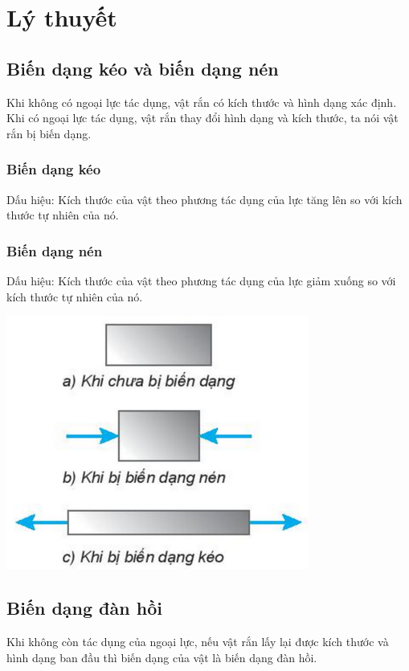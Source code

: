 \setcounter{section}{0}
\section{Lý thuyết}
\subsection{Biến dạng kéo và biến dạng nén}
Khi không có ngoại lực tác dụng, vật rắn có kích thước và hình dạng xác định. Khi có ngoại lực tác dụng, vật rắn thay đổi hình dạng và kích thước, ta nói vật rắn bị biến dạng.

\begin{minipage}{0.6\textwidth}
	\subsubsection{Biến dạng kéo}
	Dấu hiệu: Kích thước của vật theo phương tác dụng của lực tăng lên so với kích thước tự nhiên của nó.
	\subsubsection{Biến dạng nén}
	Dấu hiệu: Kích thước của vật theo phương tác dụng của lực giảm xuống so với kích thước tự nhiên của nó.
\end{minipage}
\begin{minipage}{0.4\textwidth}
	\begin{center}
		\includegraphics[scale=0.6]{../figs/G10-028-1}
	\end{center}
\end{minipage}
\subsection{Biến dạng đàn hồi}
Khi không còn tác dụng của ngoại lực, nếu vật rắn lấy lại được kích thước và hình dạng ban đầu thì biến dạng của vật là biến dạng đàn hồi.

